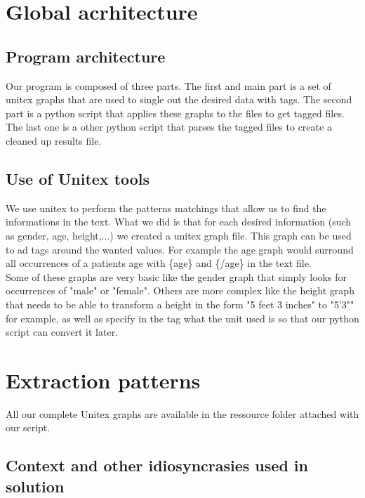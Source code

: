 \documentclass{eplDoc}
\begin{document}
\maketitle
\newpage

\section{Global acrhitecture}

\subsection{Program architecture}

Our program is composed of three parts. The first and main part is a set of unitex graphs that are used to single out the desired data with tags. The second part is a python script that applies these graphs to the files to get tagged files. The last one is a other python script that parses the tagged files to create a cleaned up results file. 

\subsection{Use of Unitex tools}

We use unitex to perform the patterns matchings that allow us to find the informations in the text. What we did is that for each desired information (such as gender, age, height,...) we created a unitex graph file. This graph can be used to ad tags around the wanted values. For example the age graph would surround all occurrences of a patients age with \{age\} and \{/age\} in the text file. \\ 
Some of these graphs are very basic like the gender graph that simply looks for occurrences of "male" or "female". Others are more complex like the height graph that needs to be able to transform a height in the form "5 feet 3 inches" to "5'3"" for example, as well as specify in the tag what the unit used is so that our python script can convert it later. \\ 

\section{Extraction patterns}

All our complete Unitex graphs are available in the ressource folder attached with our script. 
\subsection{Context and other idiosyncrasies used in solution}
\end{document}
